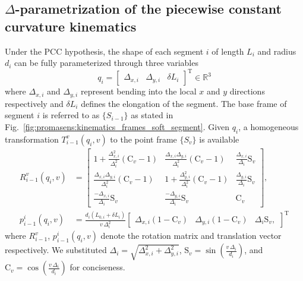 \subsection{$\Delta$-parametrization of the piecewise constant curvature kinematics}\label{sub:promasens:kinematic_model_pcc}

Under the \gls{PCC} hypothesis, the shape of each segment $i$ of length $L_{i}$ and radius $d_i$ can be fully parameterized through three variables
\begin{equation}
    q_i = \begin{bmatrix}\Delta_{x,i} & \Delta_{y,i} & \delta L_{i} \end{bmatrix}^{\mathrm{T}} \in \mathbb{R}^3
\end{equation}
where $\Delta_{x,i}$ and $\Delta_{y,i}$ represent bending into the local $x$ and $y$ directions respectively and $\delta L_i$ defines the elongation of the segment.
The base frame of segment $i$ is referred to as $\{S_{i-1}\}$ as stated in Fig.~\ref{fig:promasens:kinematics_frames_soft_segment}. Given $q_i$, a homogeneous transformation $T_{i-1}^{v}(q_i, v)$ to the point frame $\{S_{v}\}$ is available
\begin{equation}
\label{eq:promasens:transform_improved_q}
\begin{split}
    R_{i-1}^{v}(q_i,v) &=
    \begin{bmatrix}
        1 + \frac{\Delta_{x,i}^2}{\Delta_{i}^2} \left ( \mathrm{C}_v - 1 \right ) & \frac{\Delta_{x,i} \Delta_{y,i}}{\Delta_{i}^2} \left ( \mathrm{C}_v - 1 \right ) & \frac{\Delta_{x,i}}{\Delta_i} \mathrm{S}_v\\
        \frac{\Delta_{x,i} \Delta_{y,i}}{\Delta_{i}^2} \left ( \mathrm{C}_v - 1 \right ) & 1 + \frac{\Delta_{y,i}^2}{\Delta_{i}^2} \left ( \mathrm{C}_v - 1 \right ) & \frac{\Delta_{y,i}}{\Delta_i} \mathrm{S}_v\\
        \frac{-\Delta_{x,i}}{\Delta_i} \mathrm{S}_v & \frac{-\Delta_{y,i}}{\Delta_i} \mathrm{S}_v & \mathrm{C}_v
    \end{bmatrix},\\
    p_{i-1}^{i}(q_i,v) &= \frac{d_i ( L_{0,i}+\delta L_i)}{v \, \Delta_i^2}
    \begin{bmatrix}
        \Delta_{x,i} (1 - \mathrm{C}_v) & \Delta_{y,i} (1 - \mathrm{C}_v) & \Delta_{i} \mathrm{S}_v,
    \end{bmatrix}^{\mathrm{T}}
\end{split}
\end{equation}
where $R_{i-1}^{v}$, $p_{i-1}^{i}(q_i,v)$ denote the rotation matrix and translation vector respectively. We substituted $\Delta_i = \sqrt{\Delta_{x,i}^2 + \Delta_{y,i}^2}$, $\mathrm{S}_v = \sin \left (\frac{v \, \Delta_i}{d_i} \right )$, and $\mathrm{C}_v = \cos \left ( \frac{v \, \Delta_i}{d_i} \right )$ for conciseness.

